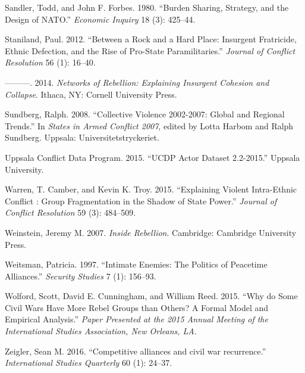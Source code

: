 \documentclass[12pt,]{article}
\begin{document}
\hypertarget{ref-Sandler1980}{}
Sandler, Todd, and John F. Forbes. 1980. ``Burden Sharing, Strategy, and
the Design of NATO.'' \emph{Economic Inquiry} 18 (3): 425--44.

\hypertarget{ref-Staniland2012d}{}
Staniland, Paul. 2012. ``Between a Rock and a Hard Place: Insurgent
Fratricide, Ethnic Defection, and the Rise of Pro-State
Paramilitaries.'' \emph{Journal of Conflict Resolution} 56 (1): 16--40.

\hypertarget{ref-Staniland2014}{}
---------. 2014. \emph{Networks of Rebellion: Explaining Insurgent
Cohesion and Collapse}. Ithaca, NY: Cornell University Press.

\hypertarget{ref-Sundberg2008a}{}
Sundberg, Ralph. 2008. ``Collective Violence 2002-2007: Global and
Regional Trends.'' In \emph{States in Armed Conflict 2007}, edited by
Lotta Harbom and Ralph Sundberg. Uppsala: Universitetstryckeriet.

\hypertarget{ref-ucdpactor}{}
Uppsala Conflict Data Program. 2015. ``UCDP Actor Dataset 2.2-2015.''
Uppsala University.

\hypertarget{ref-Warren2015}{}
Warren, T. Camber, and Kevin K. Troy. 2015. ``Explaining Violent
Intra-Ethnic Conflict : Group Fragmentation in the Shadow of State
Power.'' \emph{Journal of Conflict Resolution} 59 (3): 484--509.

\hypertarget{ref-Weinstein2007}{}
Weinstein, Jeremy M. 2007. \emph{Inside Rebellion}. Cambridge: Cambridge
University Press.

\hypertarget{ref-Weitsman1997}{}
Weitsman, Patricia. 1997. ``Intimate Enemies: The Politics of Peacetime
Alliances.'' \emph{Security Studies} 7 (1): 156--93.

\hypertarget{ref-Wolford}{}
Wolford, Scott, David E. Cunningham, and William Reed. 2015. ``Why do
Some Civil Wars Have More Rebel Groups than Others? A Formal Model and
Empirical Analysis.'' \emph{Paper Presented at the 2015 Annual Meeting
of the International Studies Association, New Orleans, LA}.

\hypertarget{ref-Zeigler2016}{}
Zeigler, Sean M. 2016. ``Competitive alliances and civil war
recurrence.'' \emph{International Studies Quarterly} 60 (1): 24--37.
\end{document}
